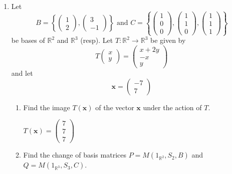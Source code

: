 \documentclass[letterpaper]{article}
\begin{document}
\begin{enumerate}
\item
Let
\[
B=
\left\{\left(\begin{array}{r}1\\2\end{array}\right),\left(\begin{array}{r}3\\-1\end{array}\right)\right\}
\text{ and }
C=\left\{\left(\begin{array}{r}1\\0\\0\end{array}\right),\left(\begin{array}{r}1\\1\\0\end{array}\right),\left(\begin{array}{r}1\\1\\1\end{array}\right)\right\}
\]
be bases of $\mathbb{R}^2$ and $\mathbb{R}^3$ (resp). Let $T:\mathbb{R}^2\to \mathbb{R}^3$ be given by
\[T\left(\begin{array}{r}x\\y\end{array}\right)=\left(\begin{array}{c}x+2y\\-x\\y\end{array}\right)\]
and let
\[\mathbf{x}=\left(\begin{array}{r}-7\\7\end{array}\right)\]
  \begin{enumerate}
  \item
  Find the image $T(\mathbf{x})$ of the vector $\mathbf{x}$ under the action of $T$.

  $T(\mathbf{x})=\left(\begin{array}{r}7\\7\\7\end{array}\right)$
  \item
  Find the change of basis matrices $P=M(1_{\mathbb{R}^2},S_2,B)$ and $Q=M(1_{\mathbb{R}^3},S_3,C)$.


\end{enumerate}
\end{enumerate}
\end{document}
